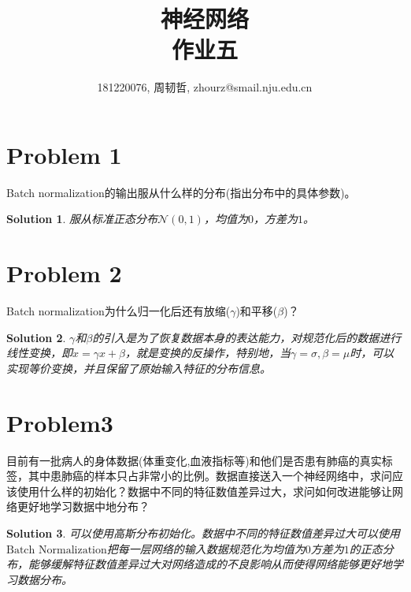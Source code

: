 \documentclass[a4paper,UTF8]{article}
\numberwithin{equation}{section}
\newtheorem*{solution}{Solution}
\begin{document}
\title{神经网络\\
作业五}
\author{181220076, 周韧哲, zhourz@smail.nju.edu.cn}
\maketitle

\section*{Problem 1}
Batch normalization的输出服从什么样的分布(指出分布中的具体参数)。
\begin{solution}服从标准正态分布$\mathcal{N}(0,1)$，均值为$0$，方差为$1$。
\end{solution}

\section*{Problem 2}
Batch normalization为什么归一化后还有放缩($\gamma$)和平移($\beta$)？
\begin{solution}
	$\gamma$和$\beta$的引入是为了恢复数据本身的表达能力，对规范化后的数据进行线性变换，即$\hat{x}=\gamma x+\beta$，就是变换的反操作，特别地，当$\gamma=\sigma,\beta=\mu$时，可以实现等价变换，并且保留了原始输入特征的分布信息。
\end{solution}
\section*{Problem3}
目前有一批病人的身体数据(体重变化,血液指标等)和他们是否患有肺癌的真实标签，其中患肺癌的样本只占非常小的比例。数据直接送入一个神经网络中，求问应该使用什么样的初始化？数据中不同的特征数值差异过大，求问如何改进能够让网络更好地学习数据中地分布？
\begin{solution}
	可以使用高斯分布初始化。数据中不同的特征数值差异过大可以使用$\text{Batch Normalization}$把每一层网络的输入数据规范化为均值为$0$方差为$1$的正态分布，能够缓解特征数值差异过大对网络造成的不良影响从而使得网络能够更好地学习数据分布。
\end{solution}
\end{document}

